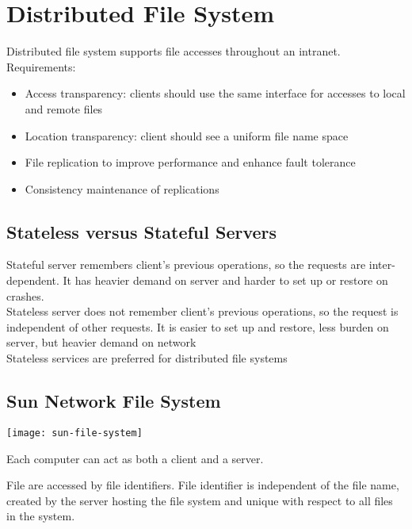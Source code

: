 \chapter{Distributed File System}

\begin{multicols*}{2}
\noindent Distributed file system supports file accesses throughout an intranet. Requirements:
\begin{itemize}
    \item Access transparency: clients should use the same interface for accesses to local and remote files
    \item Location transparency: client should see a uniform file name space
    \item File replication to improve performance and enhance fault tolerance
    \item Consistency maintenance of replications
\end{itemize}

\section{Stateless versus Stateful Servers}

\noindent Stateful server remembers client’s previous operations, so the requests are inter-dependent. It has heavier demand on server and harder to set up or restore on crashes.\\

\noindent Stateless server does not remember client’s previous operations, so the request is independent of other requests. It is easier to set up and restore, less burden on server, but heavier demand on network\\

\noindent Stateless services are preferred for distributed file systems

\section{Sun Network File System}

\begin{center}
\texttt{[image: sun-file-system]}
\end{center}

\noindent Each computer can act as both a client and a server.

\noindent File are accessed by file identifiers. File identifier is independent of the file name, created by the server hosting the file system and unique with respect to all files in the system. 


\end{multicols*}
